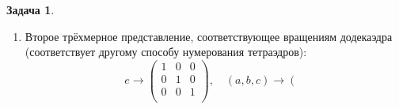 \documentclass[12pt]{article}
\theoremstyle{definition}
\newtheorem{zad}{Задача}[section]
\begin{document}
\begin{zad}
\begin{itemize}
\begin{enumerate}
\begin{equation*}
\begin{array}{ccc}
    0 & 1 & 0\\
    0 & 0 & 1\\
    \end{array}
    \right),\quad (a,b,c)\rightarrow
        \left(
    \begin{array}{ccc}
    \cos\frac{2\pi}{3} & -\sin\frac{2\pi}{3} & 0\\
    \sin\frac{2\pi}{3} & \cos\frac{2\pi}{3} & 0\\
    0 & 0 & 1\\
    \end{array}
    \right),\quad (a,b)(c,d)\rightarrow
        \left(
    \begin{array}{ccc}
    \cos\pi & -\sin\pi & 0\\
    \sin\pi & \cos\pi & 0\\
    0 & 0 & 1\\
    \end{array}
    \right)
    \end{equation*}
    \begin{equation*}
        (1,2,3,4,5)\rightarrow
        \left(
    \begin{array}{ccc}
    \cos\frac{2\pi}{5} & -\sin\frac{2\pi}{5} & 0\\
    \sin\frac{2\pi}{5} & \cos\frac{2\pi}{5} & 0\\
    0 & 0 & 1\\
    \end{array}
    \right),\quad (1,2,3,5,4)\rightarrow
        \left(
    \begin{array}{ccc}
    \cos\frac{4\pi}{5} & -\sin\frac{4\pi}{5} & 0\\
    \sin\frac{4\pi}{5} & \cos\frac{4\pi}{5} & 0\\
    0 & 0 & 1\\
    \end{array}
    \right)
    \end{equation*}
    \item Второе трёхмерное представление, соответствующее вращениям додекаэдра (соответствует другому способу нумерования тетраэдров):
        \begin{equation*}
        e\rightarrow
        \left(
    \begin{array}{ccc}
    1 & 0 & 0\\
    0 & 1 & 0\\
    0 & 0 & 1\\
    \end{array}
    \right),\quad (a,b,c)\rightarrow
        \left(
    \begin{array}{ccc}

\end{array}
\end{equation*}
\end{enumerate}
\end{itemize}
\end{zad}
\end{document}
